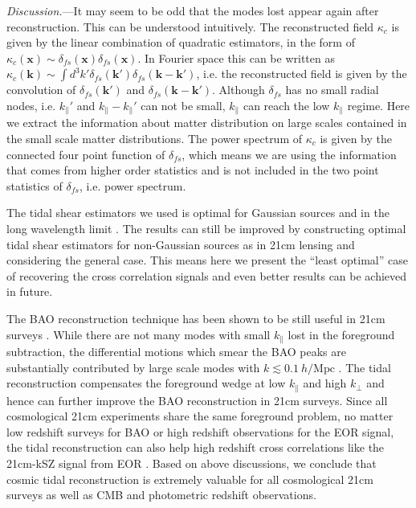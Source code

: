 \documentclass[aps,prl,twocolumn,showpacs,superscriptaddress,groupedaddress,nofootinbib]{revtex4}  %
\newcommand{\mr}{\mathrm}
\begin{document}
{\it Discussion.}---It may seem to be odd that the modes lost appear again
after reconstruction. This can be understood intuitively.
The reconstructed field $\kappa_c$ is given by the linear combination of 
quadratic estimators, in the form of 
$\kappa_c(\bm{x})\sim\delta_{fs}(\bm{x})\delta_{fs}(\bm{x})$. In Fourier 
space this can be written as $\kappa_c(\bm{k})\sim\int d^3k'
\delta_{fs}(\bm{k}')\delta_{fs}(\bm{k}-\bm{k}')$, i.e. the reconstructed 
field is given by the convolution of $\delta_{fs}(\bm{k}')$ and 
$\delta_{fs}(\bm{k}-\bm{k}')$. Although $\delta_{fs}$ has no small radial
nodes, i.e. $k_{\parallel}'$ and $k_\parallel-k_{\parallel}'$ can not be small,
$k_\parallel$ can reach the low $k_\parallel$ regime.
Here we extract the information about matter distribution on large scales 
contained in the small scale matter distributions. The power spectrum of 
$\kappa_c$ is given by the connected four point function of $\delta_{fs}$,
which means we are using the information that comes from higher order statistics
and is not included in the two point statistics of $\delta_{fs}$, i.e. 
power spectrum.

The tidal shear estimators we used is optimal for Gaussian sources and in the 
long wavelength limit \cite{2015:zhu}.
The results can still be improved by constructing optimal tidal shear 
estimators for non-Gaussian sources as in 21cm lensing \cite{2010:lu} and 
considering the general case. This means here we present the ``least optimal''
case of recovering the cross correlation signals and even better results can be
achieved in future.

The BAO reconstruction technique \cite{2007:bao} has been shown to be still
useful in 21cm surveys \cite{2015:bao1}\cite{2015:bao2}. While there are not 
many modes with small $k_\parallel$ lost in the foreground subtraction, the 
differential motions which smear the BAO peaks are substantially contributed
by large scale modes with $k\lesssim0.1\ h/\mr{Mpc}$ \cite{2007:bao}.
The tidal reconstruction compensates the foreground wedge at low $k_\parallel$
and high $k_\perp$ and hence can further improve the BAO reconstruction in 
21cm surveys. Since all cosmological 21cm experiments share the same foreground
problem, no matter low redshift surveys for BAO or high redshift observations
for the EOR signal, the tidal reconstruction can also help high redshift cross 
correlations like the 21cm-kSZ signal from EOR \cite{2015:marcelo}. Based
on above discussions, we conclude that cosmic tidal reconstruction is extremely
valuable for all cosmological 21cm surveys as well as CMB and photometric
redshift observations.
\end{document}
